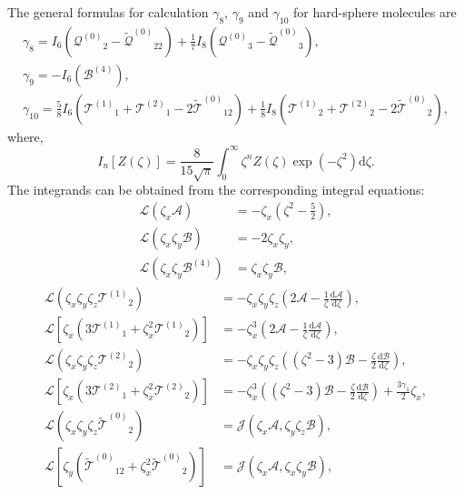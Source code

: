 \documentclass[review]{elsarticle}
\newcommand{\dd}{\mathrm{d}}
\newcommand{\der}[2][]{\frac{\dd#1}{\dd#2}}
\newcommand{\B}{\ensuremath{\mathcal{B}^{(4)}}}
\newcommand{\Q}{\ensuremath{\mathcal{Q}^{(0)}}}
\newcommand{\T}[1]{\ensuremath{\mathcal{T}^{(#1)}}}
\newcommand{\TT}{\ensuremath{\tilde{\mathcal{T}}^{(0)}}}
\newcommand{\QQ}{\ensuremath{\tilde{\mathcal{Q}}^{(0)}}}
\begin{document}
The general formulas for calculation \(\gamma_8\), \(\gamma_9\) and \(\gamma_{10}\)
for hard-sphere molecules are~\citep{Sone2000, Sone2002, Sone2007}
\begin{gather}
    \gamma_8 = I_6\left(\Q_2 - \QQ_{22}\right) + \frac17 I_8\left(\Q_3 - \QQ_3\right), \label{eq:gamma_8}\\
    \gamma_9 = -I_6\left(\B\right), \label{eq:gamma_9}\\
    \gamma_{10} = \frac58 I_6\left(\T{1}_1 + \T{2}_1 - 2\TT_{12}\right)
        + \frac18 I_8\left(\T{1}_2 + \T{2}_2 - 2\TT_2\right), \label{eq:gamma_10}
\end{gather}
where,
\begin{equation}\label{eq:I_n}
    I_n[Z(\zeta)] = \frac{8}{15\sqrt{\pi}} \int_0^\infty \zeta^n Z(\zeta) \exp(-\zeta^2) \dd\zeta.
\end{equation}
The integrands can be obtained from the corresponding integral equations:
\begin{align}
    \mathcal{L}\left(\zeta_x\mathcal{A}\right) &= -\zeta_x\left(\zeta^2-\frac52\right), \label{eq:A}\\
    \mathcal{L}\left(\zeta_x\zeta_y\mathcal{B}\right) &= -2\zeta_x\zeta_y, \label{eq:B}\\
    \mathcal{L}\left(\zeta_x\zeta_y\B\right) &= \zeta_x\zeta_y\mathcal{B}, \label{eq:B_4}
\end{align}
\begin{align}
    \mathcal{L}\left( \zeta_x\zeta_y\zeta_z\T{1}_2 \right)
        &= -\zeta_x\zeta_y\zeta_z\left(2\mathcal{A} - \frac1\zeta\der[\mathcal{A}]{\zeta}\right), \label{eq:T2a}\\
    \mathcal{L}\left[ \zeta_x\left(3\T{1}_1 + \zeta_x^2\T{1}_2\right) \right]
        &= -\zeta_x^3\left(2\mathcal{A} - \frac1\zeta\der[\mathcal{A}]{\zeta}\right), \label{eq:T1a}\\
    \mathcal{L}\left( \zeta_x\zeta_y\zeta_z\T{2}_2 \right)
        &= -\zeta_x\zeta_y\zeta_z\left((\zeta^2-3)\mathcal{B} - \frac\zeta2\der[\mathcal{B}]{\zeta}\right), \label{eq:T2b}\\
    \mathcal{L}\left[ \zeta_x\left(3\T{2}_1 + \zeta_x^2\T{2}_2\right) \right]
        &= -\zeta_x^3\left((\zeta^2-3)\mathcal{B} - \frac\zeta2\der[\mathcal{B}]{\zeta}\right) + \frac{3\gamma_1}{2}\zeta_x, \label{eq:T1b}\\
    \mathcal{L}\left( \zeta_x\zeta_y\zeta_z\TT_2 \right)
        &= \mathcal{J}\left( \zeta_x\mathcal{A}, \zeta_y\zeta_z\mathcal{B} \right), \label{eq:TT2}\\
    \mathcal{L}\left[ \zeta_y\left(\TT_{12} + \zeta_x^2\TT_2\right) \right]
        &= \mathcal{J}\left( \zeta_x\mathcal{A}, \zeta_x\zeta_y\mathcal{B} \right), \label{eq:TT12}
\end{align}
\end{document}
